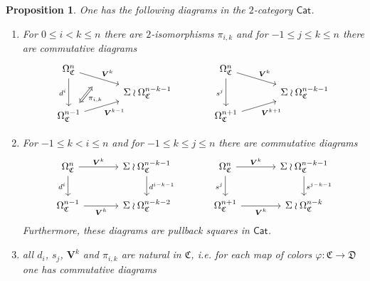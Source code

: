 \documentclass[a4paper,10pt
,draft
]{article}%
\numberwithin{equation}{section}
\numberwithin{figure}{section}
\newtheorem{proposition}[equation]{Proposition}%
\theoremstyle{definition} %
\newcommand{\1}{\ensuremath{\mathbbm 1}}%
\begin{document}
\begin{proposition}
      \label{CATDIAG PROP}
      One has the following diagrams in the $2$-category
$\mathsf{Cat}$.
\begin{enumerate}[label = (\roman*)]
\item
For $0\leq i < k \leq n$ there are $2$-isomorphisms $\pi_{i,k}$ and for $-1 \leq j \leq k \leq n$ there are commutative diagrams
\begin{equation}
\begin{tikzcd}[row sep = tiny, column sep = 35pt]
	\Omega_{\mathfrak{C}}^n
	\arrow{dr}[swap,name=U]{}{\boldsymbol{V}^k} \arrow{dd}[swap]{d^i} &
&
	\Omega_{\mathfrak{C}}^n
	\arrow{dr}{\boldsymbol{V}^k} \arrow{dd}[swap]{s^j} &
\\
	& \Sigma \wr \Omega_{\mathfrak{C}}^{n-k-1}
&
	& \Sigma \wr \Omega_{\mathfrak{C}}^{n-k-1}
\\
	|[alias=V]|
	\Omega_{\mathfrak{C}}^{n-1} \arrow{ur}[swap]{\boldsymbol{V}^{k-1}} &
&
	\Omega_{\mathfrak{C}}^{n+1} \arrow{ur}[swap]{\boldsymbol{V}^{k+1}} &
\arrow[Leftrightarrow, from=V, to=U,shorten >=0.15cm,shorten <=0.15cm
,swap,"\pi_{i,k}"
]
\end{tikzcd}
\end{equation}
\item
For $-1 \leq k < i \leq n$ and for $-1 \leq k \leq j \leq n$
there are commutative diagrams
\begin{equation}
\begin{tikzcd}[row sep = 10pt, column sep = 35pt]
	\Omega^n_{\mathfrak{C}}
	\arrow{r}[swap,name=U]{}{\boldsymbol{V}^k} \arrow{dd}[swap]{d^i} &
	\Sigma \wr \Omega^{n-k-1}_{\mathfrak{C}} \ar{dd}{d^{i-k-1}}
&
	\Omega^n_{\mathfrak{C}}
	\arrow{r}{\boldsymbol{V}^k} \arrow{dd}[swap]{s^j} &
	\Sigma \wr \Omega^{n-k-1}_{\mathfrak{C}} \ar{dd}{s^{j-k-1}}
\\
\\
	|[alias=V]|
	\Omega^{n-1}_{\mathfrak{C}} \arrow{r}[swap]{\boldsymbol{V}^{k}} &
	\Sigma \wr \Omega^{n-k-2}_{\mathfrak{C}}
&
	\Omega^{n+1}_{\mathfrak{C}} \arrow{r}[swap]{\boldsymbol{V}^{k}} &
	\Sigma \wr \Omega^{n-k}_{\mathfrak{C}}
\end{tikzcd}
\end{equation}
Furthermore, these diagrams are pullback squares in $\mathsf{Cat}$.
\item 
all $d_i$, $s_j$, $\boldsymbol{V}^k$ and $\pi_{i,k}$
are natural in $\mathfrak{C}$, i.e. for each map of colors
$\varphi \colon \mathfrak{C} \to \mathfrak{D}$ one has commutative diagrams
\[
\begin{tikzcd}[column sep = 10pt, row sep = small]

\end{tikzcd}\]
\end{enumerate}
\end{proposition}
\end{document}
